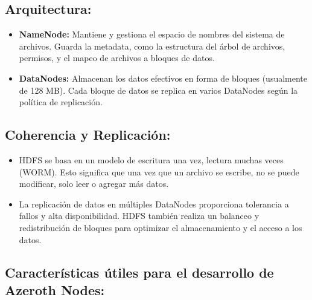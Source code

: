 \subsection{Arquitectura:}

\begin{itemize}
    \item \textbf{NameNode:} Mantiene y gestiona el espacio de nombres del sistema de archivos. Guarda la metadata, como la estructura del árbol de archivos, permisos, y el mapeo de archivos a bloques de datos.
    \item \textbf{DataNodes:} Almacenan los datos efectivos en forma de bloques (usualmente de 128 MB). Cada bloque de datos se replica en varios DataNodes según la política de replicación.
\end{itemize}

\subsection{Coherencia y Replicación:}

\begin{itemize}
    \item HDFS se basa en un modelo de escritura una vez, lectura muchas veces (WORM). Esto significa que una vez que un archivo se escribe, no se puede modificar, solo leer o agregar más datos.
    \item La replicación de datos en múltiples DataNodes proporciona tolerancia a fallos y alta disponibilidad. HDFS también realiza un balanceo y redistribución de bloques para optimizar el almacenamiento y el acceso a los datos.
\end{itemize}

\subsection{Características útiles para el desarrollo de Azeroth Nodes:}

